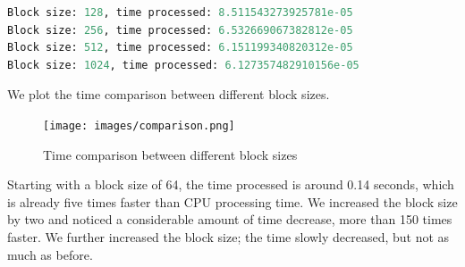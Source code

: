 \documentclass[12pt]{article}
\begin{document}
\begin{lstlisting}[language=Python]
Block size: 128, time processed: 8.511543273925781e-05
Block size: 256, time processed: 6.532669067382812e-05
Block size: 512, time processed: 6.151199340820312e-05
Block size: 1024, time processed: 6.127357482910156e-05
\end{lstlisting}

\noindent
We plot the time comparison between different block sizes. 

\begin{figure}[H]
\centering
    \texttt{[image: images/comparison.png]}
    \caption{Time comparison between different block sizes}
\end{figure}

\noindent
Starting with a block size of 64, the time processed is around 0.14 seconds, which is already five times faster than CPU processing time. We increased the block size by two and noticed a considerable amount of time decrease, more than 150 times faster. We further increased the block size; the time slowly decreased, but not as much as before. 
\end{document}
